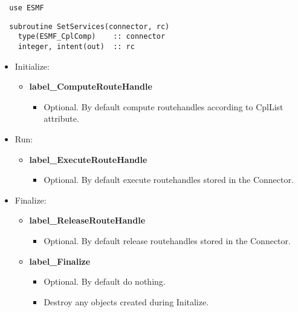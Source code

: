 \begin{verbatim}  use ESMF
\end{verbatim}

\begin{verbatim}  subroutine SetServices(connector, rc)
    type(ESMF_CplComp)    :: connector
    integer, intent(out)  :: rc
\end{verbatim}

\begin{itemize}
  \item Initialize:
  \begin{itemize}
    \item {\bf label\_ComputeRouteHandle}
    \begin{itemize}
      \item Optional. By default compute routehandles according to CplList attribute.
    \end{itemize}
  \end{itemize}
  \item Run:
  \begin{itemize}
    \item {\bf label\_ExecuteRouteHandle}
    \begin{itemize}
      \item Optional. By default execute routehandles stored in the Connector.
    \end{itemize}
  \end{itemize}
  \item Finalize:
  \begin{itemize}
    \item {\bf label\_ReleaseRouteHandle}
    \begin{itemize}
      \item Optional. By default release routehandles stored in the Connector.
    \end{itemize}
    \item {\bf label\_Finalize}
    \begin{itemize}
      \item Optional. By default do nothing.
      \item Destroy any objects created during Initalize.
    \end{itemize}
  \end{itemize}
\end{itemize}

\mbox{}\hrulefill\ 


